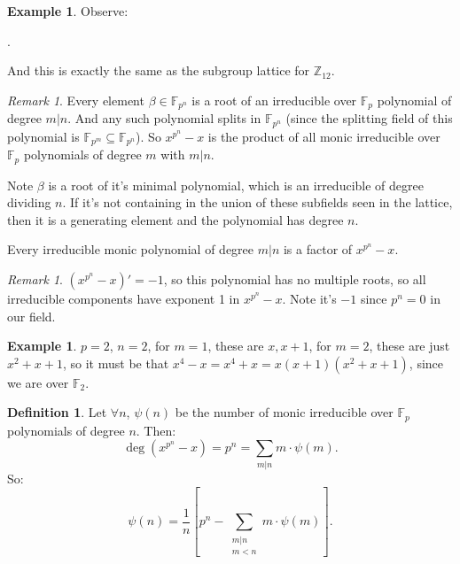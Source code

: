 \documentclass[9pt,reqno,twoside]{amsbook}
\theoremstyle{plain}
\numberwithin{section}{chapter}
\numberwithin{equation}{chapter}
\theoremstyle{definition}
\newtheorem{Def}[theorem]{Definition}
\newtheorem{Ex}[theorem]{Example}
\theoremstyle{remark}
\newtheorem{rem}[theorem]{Remark}
\theoremstyle{plain}
\newcommand{\sub}{\subseteq}
\newcommand{\z}{\mathbb{Z}}
\newcommand{\F}{\mathbb{F}}
\newcommand{\fracc}{\frac}
\begin{document}
\begin{Ex}
Observe:
\begin{center}
.
\end{center}
And this is exactly the same as the subgroup lattice for $\z_{12}$. 
\end{Ex}

\begin{rem}
Every element $\beta \in \F_{p^n}$ is a root of an irreducible over $\F_p$ polynomial of degree $m|n$. And any such polynomial splits in $\F_{p^n}$ (since the splitting field of this polynomial is $\F_{p^m} \sub \F_{p^n}$). So $x^{p^n} - x$ is the product of all monic irreducible over $\F_p$ polynomials of degree $m$ with $m|n$. 

Note $\beta$ is a root of it's minimal polynomial, which is an irreducible of degree dividing $n$. If it's not containing in the union of these subfields seen in the lattice, then it is a generating element and the polynomial has degree $n$. 

Every irreducible monic polynomial of degree $m|n$ is a factor of $x^{p^n} - x$. 
\end{rem}

\begin{rem}
$(x^{p^n} - x)' = -1$, so this polynomial has no multiple roots, so all irreducible components have exponent 1 in $x^{p^n} - x$. Note it's $-1$ since $p^n = 0$ in our field. 
\end{rem}

\begin{Ex}
$p = 2$, $n = 2$, for $m= 1$, these are $x, x+ 1$, for $m = 2$, these are just $x^2 + x + 1$, so it must be that $x^4 -x = x^4 + x = x(x + 1)(x^2 + x + 1)$, since we are over $\F_2$. 
\end{Ex}

\begin{Def}
Let $\forall n$, $\psi(n)$ be the number of monic irreducible over $\F_p$ polynomials of degree $n$. Then:
$$
\deg(x^{p^n} - x) = p^n = \sum_{m|n}m\cdot \psi(m).
$$
So:
$$\psi(n) = \fracc{1}{n}\left[ p^n - \sum_{\substack{m|n\\m<n}}m\cdot \psi(m)\right].
$$
\end{Def}
\end{document}

